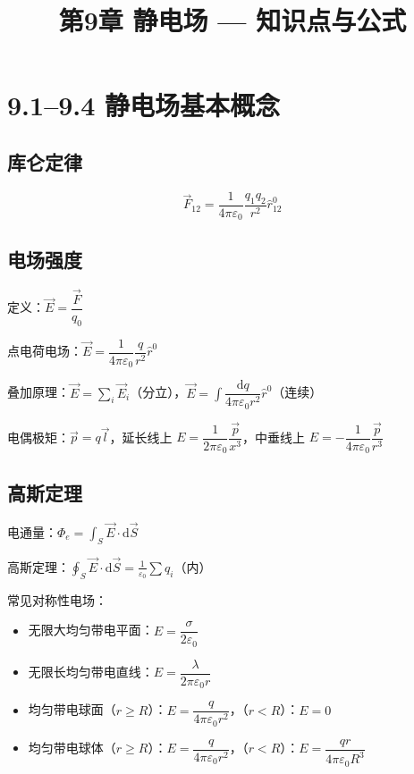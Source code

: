 \documentclass{ctexart}
\title{\textbf{第9章 静电场} --- 知识点与公式}
\author{}
\date{}
\begin{document}
\maketitle

\section*{9.1--9.4 静电场基本概念}

\subsection*{库仑定律}
\[
\vec{F}_{12} = \frac{1}{4\pi\varepsilon_0}\frac{q_1q_2}{r^{2}}\hat{r}_{12}^{0}
\]

\subsection*{电场强度}
定义：$\vec{E} = \dfrac{\vec{F}}{q_0}$

点电荷电场：$\vec{E} = \dfrac{1}{4\pi\varepsilon_0}\dfrac{q}{r^{2}}\hat{r}^{0}$

叠加原理：$\vec{E} = \sum\limits_i \vec{E}_i$（分立），$\vec{E} = \displaystyle\int \dfrac{\mathrm{d}q}{4\pi\varepsilon_0 r^{2}}\hat{r}^{0}$（连续）

电偶极矩：$\vec{p} = q\vec{l}$，延长线上 $E = \dfrac{1}{2\pi\varepsilon_0}\dfrac{\vec{p}}{x^{3}}$，中垂线上 $E = -\dfrac{1}{4\pi\varepsilon_0}\dfrac{\vec{p}}{r^{3}}$

\subsection*{高斯定理}
电通量：$\Phi_e = \displaystyle\int_S \vec{E}\cdot\mathrm{d}\vec{S}$

高斯定理：$\displaystyle\oint_S \vec{E}\cdot\mathrm{d}\vec{S} = \frac{1}{\varepsilon_0}\sum q_i$（内）

常见对称性电场：
\begin{itemize}
  \item 无限大均匀带电平面：$E = \dfrac{\sigma}{2\varepsilon_0}$
  \item 无限长均匀带电直线：$E = \dfrac{\lambda}{2\pi\varepsilon_0 r}$
  \item 均匀带电球面（$r \ge R$）：$E = \dfrac{q}{4\pi\varepsilon_0 r^{2}}$，（$r < R$）：$E = 0$
  \item 均匀带电球体（$r \ge R$）：$E = \dfrac{q}{4\pi\varepsilon_0 r^{2}}$，（$r < R$）：$E = \dfrac{qr}{4\pi\varepsilon_0 R^{3}}$
\end{itemize}
\end{document}
